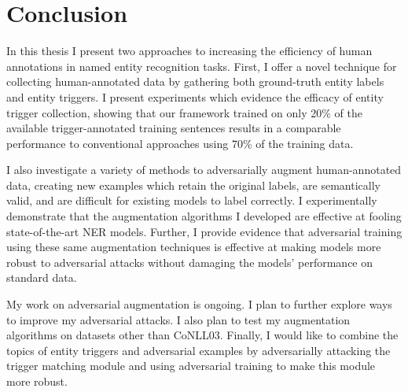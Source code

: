 \chapter{Conclusion}
In this thesis I present two approaches to increasing the efficiency of human annotations in named entity recognition tasks. First, I offer a novel technique for collecting human-annotated data by gathering both ground-truth entity labels and entity triggers. I present experiments which evidence the efficacy of entity trigger collection, showing that our framework trained on only 20\% of the available trigger-annotated training sentences results in a comparable performance to conventional approaches using 70\% of the training data. 

I also investigate a variety of methods to adversarially augment human-annotated data, creating new examples which retain the original labels, are semantically valid, and are difficult for existing models to label correctly. I experimentally demonstrate that the augmentation algorithms I developed are effective at fooling state-of-the-art NER models. Further, I provide evidence that adversarial training using these same augmentation techniques is effective at making models more robust to adversarial attacks without damaging the models' performance on standard data.

My work on adversarial augmentation is ongoing. I plan to further explore ways to improve my adversarial attacks. I also plan to test my augmentation algorithms on datasets other than CoNLL03. Finally, I would like to combine the topics of entity triggers and adversarial examples by adversarially attacking the trigger matching module and using adversarial training to make this module more robust.